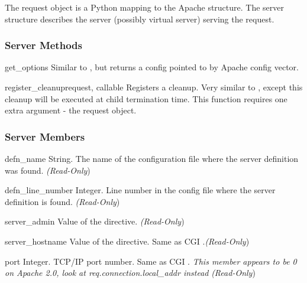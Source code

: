 The request object is a Python mapping to the Apache 
structure. The server structure describes the server (possibly virtual
server) serving the request.

\subsubsection{Server Methods\label{pyapi-mpsrv-meth}}

\begin{methoddesc}[server]{get_options}{}
  Similar to , but returns a config pointed to
  by  Apache config vector. 
\end{methoddesc}

\begin{methoddesc}[server]{register_cleanup}{request, callable}
  Registers a cleanup. Very similar to , except
  this cleanup will be executed at child termination time. This function
  requires one extra argument - the request object.
\end{methoddesc}

\subsubsection{Server Members\label{pyapi-mpsrv-mem}}

\begin{memberdesc}[server]{defn_name}
  String. The name of the configuration file where the server definition
  was found.
  \emph{(Read-Only})
\end{memberdesc}

\begin{memberdesc}[server]{defn_line_number}
  Integer. Line number in the config file where the server definition is
  found.
  \emph{(Read-Only})
\end{memberdesc}

\begin{memberdesc}[server]{server_admin}
  Value of the  directive. 
  \emph{(Read-Only})
\end{memberdesc}

\begin{memberdesc}[server]{server_hostname}
  Value of the  directive. Same as CGI .\emph{(Read-Only})
\end{memberdesc}

\begin{memberdesc}[server]{port}
  Integer. TCP/IP port number. Same as CGI .
  \emph{This member appears to be 0 on Apache 2.0, look at req.connection.local_addr instead}
  \emph{(Read-Only})
\end{memberdesc}

